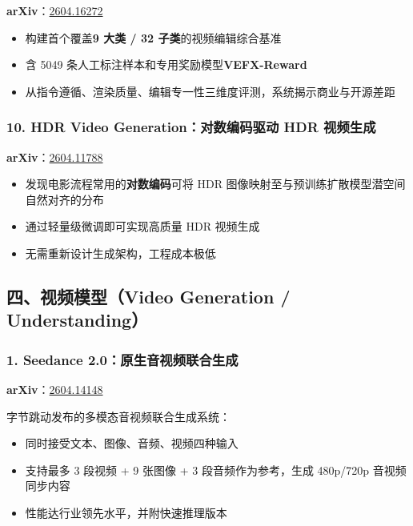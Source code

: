 \textbf{arXiv}：\href{https://arxiv.org/abs/2604.16272}{2604.16272}

\begin{itemize}[leftmargin=1.5em]
  \item 构建首个覆盖\textbf{9 大类 / 32 子类}的视频编辑综合基准
  \item 含 5049 条人工标注样本和专用奖励模型\textbf{VEFX-Reward}
  \item 从指令遵循、渲染质量、编辑专一性三维度评测，系统揭示商业与开源差距
\end{itemize}

\subsubsection{10. HDR Video Generation：对数编码驱动 HDR 视频生成}

\textbf{arXiv}：\href{https://arxiv.org/abs/2604.11788}{2604.11788}

\begin{itemize}[leftmargin=1.5em]
  \item 发现电影流程常用的\textbf{对数编码}可将 HDR 图像映射至与预训练扩散模型潜空间自然对齐的分布
  \item 通过轻量级微调即可实现高质量 HDR 视频生成
  \item 无需重新设计生成架构，工程成本极低
\end{itemize}

\subsection{四、视频模型（Video Generation / Understanding）}

\subsubsection{1. Seedance 2.0：原生音视频联合生成}

\textbf{arXiv}：\href{https://arxiv.org/abs/2604.14148}{2604.14148}

字节跳动发布的多模态音视频联合生成系统：

\begin{itemize}[leftmargin=1.5em]
  \item 同时接受文本、图像、音频、视频四种输入
  \item 支持最多 3 段视频 + 9 张图像 + 3 段音频作为参考，生成 480p/720p 音视频同步内容
  \item 性能达行业领先水平，并附快速推理版本
\end{itemize}

